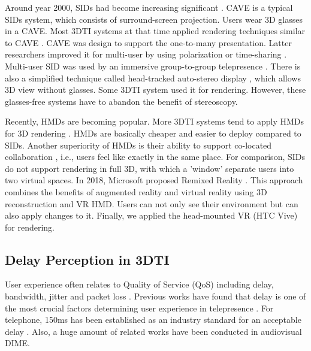 Around year 2000, SIDs had become increasing significant \cite{gross2003blue}. CAVE \cite{cruz1993surround} is a typical SIDs system, which consists of surround-screen projection. Users wear 3D glasses in a CAVE. Most 3DTI systems at that time applied rendering techniques similar to CAVE \cite{gibbs1999teleport, towles20023d, gross2003blue, kurillo2008immersive, benko2012miragetable}. CAVE was design to support the one-to-many presentation. Latter researchers improved it for multi-user by using polarization or time-sharing \cite{frohlich2005implementing, kulik2011c1x6, guan2018two}. Multi-user SID was used by an immersive group-to-group telepresence \cite{beck2013immersive}. There is also a simplified technique called head-tracked auto-stereo display \cite{benko2014dyadic, jones2014roomalive}, which allows 3D view without glasses. Some 3DTI system \cite{maimone2011encumbrance, maimone2012real, pejsa2016room2room} used it for rendering. However, these glasses-free systems have to abandon the benefit of stereoscopy.

Recently, HMDs are becoming popular. More 3DTI systems tend to apply HMDs for 3D rendering \cite{orts2016holoportation, maimone2013general, lindlbauer2018remixed, smith2018communication}. HMDs are basically cheaper and easier to deploy compared to SIDs. Another superiority of HMDs is their ability to support co-located collaboration \cite{maimone2013general, orts2016holoportation}, i.e., users feel like exactly in the same place. For comparison, SIDs do not support rendering in full 3D, with which a 'window' separate users into two virtual spaces. In 2018, Microsoft proposed Remixed Reality \cite{lindlbauer2018remixed}. This approach combines the benefits of augmented reality and virtual reality using 3D reconstruction and VR HMD. Users can not only see their environment but can also apply changes to it. Finally, we applied the head-mounted VR (HTC Vive) for rendering.

\subsection{Delay Perception in 3DTI}

User experience often relates to Quality of Service (QoS) including delay, bandwidth, jitter and packet loss \cite{donovan2014understanding}. Previous works have found that delay is one of the most crucial factors determining user experience in telepresence \cite{vogel1995distributed, brunnstrom2013qualinet, schmitt2014asymmetric, schmitt2013qoe}. For telephone, 150ms has been established as an industry standard for an acceptable delay \cite{rec2003g, percy1999understanding}. Also, a huge amount of related works have been conducted in audiovisual DIME. 

